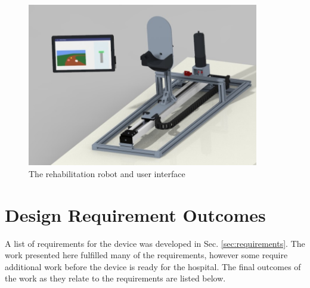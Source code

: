 \documentclass[12pt]{report}
\begin{document}
\begin{figure}[h]
	\centering
	\includegraphics[width=0.9\textwidth]{robot_cad}
	\caption{The rehabilitation robot and user interface}
	\label{fig:robot_cad}
\end{figure}		
		
	\section{Design Requirement Outcomes} \label{sec:outcomes}
	
A list of requirements for the device was developed in Sec. \ref{sec:requirements}. The work presented here fulfilled many of the requirements, however some require additional work before the device is ready for the hospital. The final outcomes of the work as they relate to the requirements are listed below. 
\end{document}
